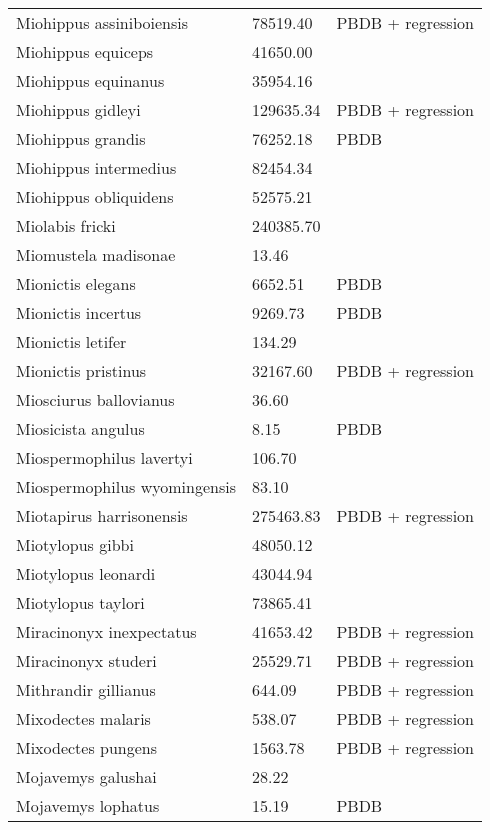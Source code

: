 \documentclass{article}
\begin{document}
\begin{center}
\begin{longtable}{p{} p{} p{} }
  Miohippus assiniboiensis & 78519.40 & PBDB + regression \\ 
  Miohippus equiceps & 41650.00 & \cite{McKenna2011} \\ 
  Miohippus equinanus & 35954.16 & \cite{Tomiya2013} \\ 
  Miohippus gidleyi & 129635.34 & PBDB + regression \\ 
  Miohippus grandis & 76252.18 & PBDB \\ 
  Miohippus intermedius & 82454.34 & \cite{Tomiya2013} \\ 
  Miohippus obliquidens & 52575.21 & \cite{Tomiya2013} \\ 
  Miolabis fricki & 240385.70 & \cite{Tomiya2013} \\ 
  Miomustela madisonae & 13.46 & \cite{Tomiya2013} \\ 
  Mionictis elegans & 6652.51 & PBDB \\ 
  Mionictis incertus & 9269.73 & PBDB \\ 
  Mionictis letifer & 134.29 & \cite{Tomiya2013} \\ 
  Mionictis pristinus & 32167.60 & PBDB + regression \\ 
  Miosciurus ballovianus & 36.60 & \cite{Tomiya2013} \\ 
  Miosicista angulus & 8.15 & PBDB \\ 
  Miospermophilus lavertyi & 106.70 & \cite{Tomiya2013} \\ 
  Miospermophilus wyomingensis & 83.10 & \cite{Tomiya2013} \\ 
  Miotapirus harrisonensis & 275463.83 & PBDB + regression \\ 
  Miotylopus gibbi & 48050.12 & \cite{Tomiya2013} \\ 
  Miotylopus leonardi & 43044.94 & \cite{Tomiya2013} \\ 
  Miotylopus taylori & 73865.41 & \cite{Tomiya2013} \\ 
  Miracinonyx inexpectatus & 41653.42 & PBDB + regression \\ 
  Miracinonyx studeri & 25529.71 & PBDB + regression \\ 
  Mithrandir gillianus & 644.09 & PBDB + regression \\ 
  Mixodectes malaris & 538.07 & PBDB + regression \\ 
  Mixodectes pungens & 1563.78 & PBDB + regression \\ 
  Mojavemys galushai & 28.22 & \cite{Tomiya2013} \\ 
  Mojavemys lophatus & 15.19 & PBDB \\ 

\end{longtable}
\end{center}
\end{document}
